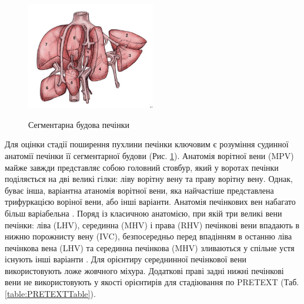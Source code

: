 \begin{figure}[h]
\centering
\includegraphics[width=0.5\textwidth]{Illustrations/segment.jpg}
\label{fig:segment} %
\caption{Сегментарна будова печінки}
\end{figure}

Для оцінки стадії поширення пухлини печінки ключовим є розуміння судинної анатомії печінки її сегментарної будови  (Рис. \ref{fig:segment}). 
Анатомія ворітної вени (MPV) майже завжди представляє собою головний стовбур, який у воротах печінки поділяється на дві великі гілки: ліву ворітну вену та праву ворітну вену. Однак, буває інша, варіантна атаномія ворітної вени, яка найчастіше представлена трифуркацією воріної вени, або інші варіанти.
Анатомія печінкових вен набагато більш варіабельна \cite{pmid22813792}. Поряд із класичною анатомією, при якій три великі вени печінки: ліва (LHV), серединна (MHV) і права (RHV) печінкові вени впадають в нижню порожнисту вену (IVC), безпосередньо перед впадінням в останню ліва печінкова вена (LHV) та серединна печінкова (MHV) зливаються у спільне устя існують інші варіанти \cite{pmid22835780}. 
Для орієнтиру середнинної печінкової вени використовують ложе жовчного міхура. Додаткові праві задні нижні печінкові вени не використовують у якості орієнтирів для стадіювання по PRETEXT (Таб. \ref{table:PRETEXTTable}).

\begin{table}[]
\caption{Cтадіювання гепатобластом по PRETEXT.}
\label{table:PRETEXTTable}
\end{table}

